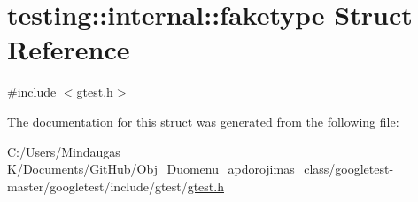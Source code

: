 \hypertarget{structtesting_1_1internal_1_1faketype}{}\section{testing\+::internal\+::faketype Struct Reference}
\label{structtesting_1_1internal_1_1faketype}


{\ttfamily \#include $<$gtest.\+h$>$}



The documentation for this struct was generated from the following file\+:\begin{DoxyCompactItemize}
\item 
C\+:/\+Users/\+Mindaugas K/\+Documents/\+Git\+Hub/\+Obj\+\_\+\+Duomenu\+\_\+apdorojimas\+\_\+class/googletest-\/master/googletest/include/gtest/\mbox{\hyperlink{googletest-master_2googletest_2include_2gtest_2gtest_8h}{gtest.\+h}}\end{DoxyCompactItemize}
